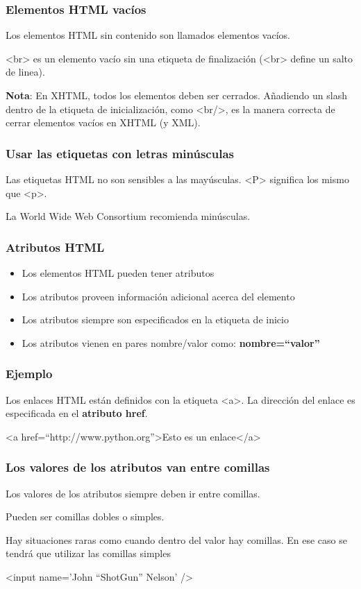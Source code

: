 \documentclass[12pt,a4paper]{beamer}
\begin{document}
\begin{frame}
	\frametitle{Elementos HTML vacíos}
	
	Los elementos HTML sin contenido son llamados elementos vacíos.
	
	<br> es un elemento vacío sin una etiqueta de finalización (<br> define un salto de linea).
	
	\textbf{Nota}: En XHTML, todos los elementos deben ser cerrados. Añadiendo un slash dentro de la etiqueta de inicialización, como <br/>, es la manera correcta de cerrar elementos vacíos en XHTML (y XML). 
\end{frame}

\begin{frame}
	\frametitle{Usar las etiquetas con letras minúsculas}
	
	Las etiquetas HTML no son sensibles a las mayúsculas. <P> significa los mismo que <p>.
	
	La World Wide Web Consortium recomienda minúsculas.
\end{frame}

\begin{frame}
	\frametitle{Atributos HTML}
	
	\begin{itemize}
		\item Los elementos HTML pueden tener atributos \pause
		\item Los atributos proveen información adicional acerca del elemento \pause
		\item Los atributos siempre son especificados en la etiqueta de inicio \pause
		\item Los atributos vienen en pares nombre/valor como: \textbf{nombre=``valor''}
	\end{itemize}
\end{frame}

 \begin{frame}
	\frametitle{Ejemplo}
	
	Los enlaces HTML están definidos con la etiqueta <a>. La dirección del enlace es especificada en el \textbf{atributo href}.
	
	\begin{framed}
		<a href=``http://www.python.org''>Esto es un enlace</a>
	\end{framed}
 \end{frame}
 
 \begin{frame}
	\frametitle{Los valores de los atributos van entre comillas}
	
	Los valores de los atributos siempre deben ir entre comillas.
	
	Pueden ser comillas dobles o simples.
	
	Hay situaciones raras como cuando dentro del valor hay comillas. En ese caso se tendrá que utilizar las comillas simples
	
	\begin{framed}
		<input name='John ``ShotGun'' Nelson' />
	\end{framed}
 \end{frame}
\end{document}
